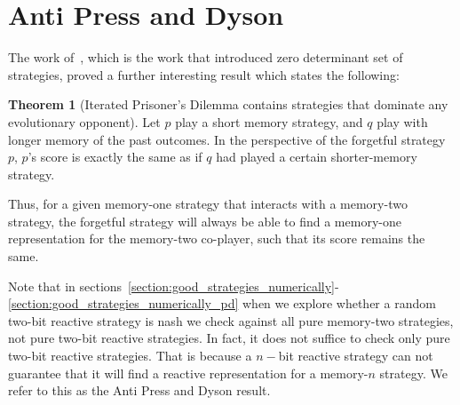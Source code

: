 \documentclass{article}
\theoremstyle{definition}
\newtheorem{theorem}{Theorem}[section]
\begin{document}
\section{Anti Press and Dyson}

The work of~\citep{press:PNAS:2012}, which is the work that introduced
zero determinant set of strategies, proved a further interesting result which
states the following:

\begin{theorem}[Iterated Prisoner's Dilemma contains strategies that dominate any evolutionary opponent]
  Let \(p\) play a short memory strategy, and \(q\) play with longer memory of
  the past outcomes. In the perspective of the forgetful strategy \(p\), \(p\)'s
  score is exactly the same as if \(q\) had played a certain shorter-memory
  strategy.
\end{theorem}

Thus, for a given memory-one strategy that interacts with a memory-two strategy,
the forgetful strategy will always be able to find a memory-one representation
for the memory-two co-player, such that its score remains the same.

Note that in sections~\ref{section:good_strategies_numerically}-
\ref{section:good_strategies_numerically_pd} when we explore whether a random
two-bit reactive strategy is nash we check against all pure memory-two
strategies, not pure two-bit reactive strategies. In fact, it does not
suffice to check only pure two-bit reactive strategies.
That is because a \(n-\)bit reactive strategy can not guarantee that it will
find a reactive representation for a memory-\(n\) strategy. We refer to this
as the Anti Press and Dyson result.


\end{document}
